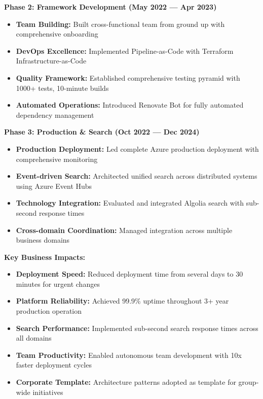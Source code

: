 \documentclass[10pt,a4paper]{article}
\begin{document}
\textbf{Phase 2: Framework Development (May 2022 — Apr 2023)}
\begin{itemize}[leftmargin=*,noitemsep,topsep=0pt]
\item \textbf{Team Building:} Built cross-functional team from ground up with comprehensive onboarding
\item \textbf{DevOps Excellence:} Implemented Pipeline-as-Code with Terraform Infrastructure-as-Code
\item \textbf{Quality Framework:} Established comprehensive testing pyramid with 1000+ tests, 10-minute builds
\item \textbf{Automated Operations:} Introduced Renovate Bot for fully automated dependency management
\end{itemize}

\textbf{Phase 3: Production \& Search (Oct 2022 — Dec 2024)}
\begin{itemize}[leftmargin=*,noitemsep,topsep=0pt]
\item \textbf{Production Deployment:} Led complete Azure production deployment with comprehensive monitoring
\item \textbf{Event-driven Search:} Architected unified search across distributed systems using Azure Event Hubs
\item \textbf{Technology Integration:} Evaluated and integrated Algolia search with sub-second response times
\item \textbf{Cross-domain Coordination:} Managed integration across multiple business domains
\end{itemize}

\textbf{Key Business Impacts:}
\begin{itemize}[leftmargin=*,noitemsep,topsep=0pt]
\item \textbf{Deployment Speed:} Reduced deployment time from several days to 30 minutes for urgent changes
\item \textbf{Platform Reliability:} Achieved 99.9\% uptime throughout 3+ year production operation
\item \textbf{Search Performance:} Implemented sub-second search response times across all domains
\item \textbf{Team Productivity:} Enabled autonomous team development with 10x faster deployment cycles
\item \textbf{Corporate Template:} Architecture patterns adopted as template for group-wide initiatives
\end{itemize}

\newpage
\end{document}
